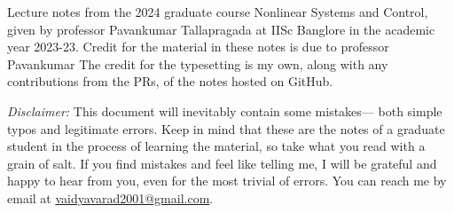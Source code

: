 Lecture notes from the 2024 graduate course Nonlinear Systems and Control, given by professor
Pavankumar Tallapragada at IISc Banglore in the academic year 2023-23. Credit for the material in these notes
is due to professor
Pavankumar The credit for the typesetting is my own, along with any contributions from the PRs, of the notes hosted
on GitHub.

\textit{Disclaimer:} This document will inevitably contain some mistakes— both
simple typos and legitimate errors. Keep in mind that these are the notes of a graduate student in the process of learning the material, so take
what you read with a grain of salt. If you find mistakes and feel like telling
me, I will be grateful and happy to hear from you, even for the most trivial of
errors. You can reach me by email at
\href{mailto:vaidyavarad2001@gmail.com}{vaidyavarad2001@gmail.com}.